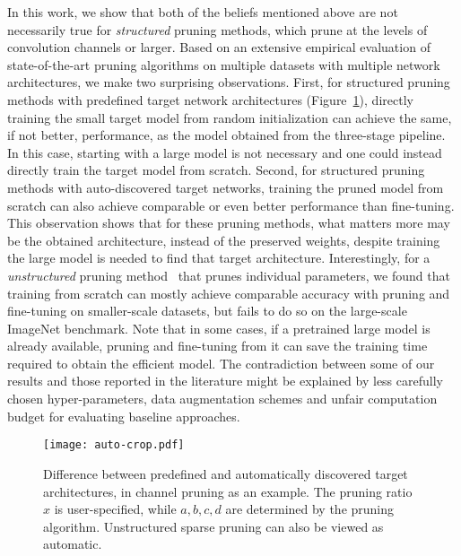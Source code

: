 In this work, we show that both of the beliefs mentioned above are not necessarily true for \emph{structured} pruning methods, which prune at the levels of convolution channels or larger. Based on an extensive empirical evaluation of state-of-the-art pruning algorithms on multiple datasets with multiple network architectures, we make two surprising observations. First, for structured pruning methods with predefined target network architectures (Figure~\ref{auto}), directly training the small target model from random initialization can achieve the same, if not better, performance, as the model obtained from the three-stage pipeline.
In this case, starting with a large model is not necessary and one could instead directly train the target model from scratch.
Second, for structured pruning methods with auto-discovered target networks, training the pruned model from scratch can also achieve comparable or even better performance than fine-tuning. This observation shows that for these pruning methods, what matters more may be the obtained architecture, instead of the preserved weights, despite training the large model is needed to find that target architecture. 
Interestingly, for a \emph{unstructured} pruning method~\cite{han2015learning} that prunes individual parameters, we found that training from scratch can mostly achieve comparable accuracy with pruning and fine-tuning on smaller-scale datasets, but fails to do so on the large-scale ImageNet benchmark.
Note that in some cases, if a pretrained large model is already available, pruning and fine-tuning from it can save the training time required to obtain the efficient model.
The contradiction between some of our results and those reported in the literature might be explained by less carefully chosen hyper-parameters, data augmentation schemes and unfair computation budget for evaluating baseline approaches.

\begin{figure}
  \begin{center}
    \texttt{[image: auto-crop.pdf]}
  \end{center}
\caption{Difference between predefined and automatically discovered target architectures, in channel pruning as an example. The pruning ratio $x$ is user-specified, while $a, b, c, d$ are determined by the pruning algorithm. Unstructured sparse pruning can also be viewed as automatic.} 
    \label{auto}
\end{figure}


